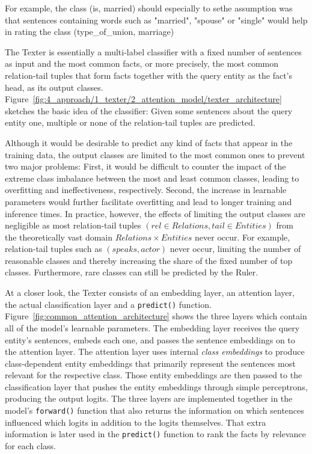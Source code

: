 

For example, the class (is, married) should especially to sethe assumption was that sentences containing words such as "married", "spouse" or "single" would help in rating the class (type\_of\_union, marriage)

The Texter is essentially a multi-label classifier with a fixed number of sentences as input and the most common facts, or more precisely, the most common relation-tail tuples that form facts together with the query entity as the fact's head, as its output classes. Figure~\ref{fig:4_approach/1_texter/2_attention_model/texter_architecture} sketches the basic idea of the classifier: Given some sentences about the query entity one, multiple or none of the relation-tail tuples are predicted.

Although it would be desirable to predict any kind of facts that appear in the training data, the output classes are limited to the most common ones to prevent two major problems: First, it would be difficult to counter the impact of the extreme class imbalance between the most and least common classes, leading to overfitting and ineffectiveness, respectively. Second, the increase in learnable parameters would further facilitate overfitting and lead to longer training and inference times. In practice, however, the effects of limiting the output classes are negligible as most relation-tail tuples $(rel \in Relations, tail \in Entities)$ from the theoretically vast domain $Relations \times Entities$ never occur. For example, relation-tail tuples such as $(speaks, actor)$ never occur, limiting the number of reasonable classes and thereby increasing the share of the fixed number of top classes. Furthermore, rare classes can still be predicted by the Ruler.

At a closer look, the Texter consists of an embedding layer, an attention layer, the actual classification layer and a \lstinline{predict()} function. Figure~\ref{fig:common_attention_architecture} shows the three layers which contain all of the model's learnable parameters. The embedding layer receives the query entity's sentences, embeds each one, and passes the sentence embeddings on to the attention layer. The attention layer uses internal \emph{class embeddings} to produce class-dependent entity embeddings that primarily represent the sentences most relevant for the respective class. Those entity embeddings are then passed to the classification layer that pushes the entity embeddings through simple perceptrons, producing the output logits. The three layers are implemented together in the model's \lstinline{forward()} function that also returns the information on which sentences influenced which logits in addition to the logits themselves. That extra information is later used in the \lstinline{predict()} function to rank the facts by relevance for each class.

